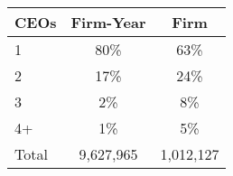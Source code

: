 \begin{tabular}{lcc}
\toprule
CEOs & Firm-Year & Firm \\
\midrule
1 & 80\% & 63\% \\
2 & 17\% & 24\% \\
3 & 2\% & 8\% \\
4+ & 1\% & 5\% \\
Total &    9,627,965 &    1,012,127 \\
\bottomrule
\end{tabular}
